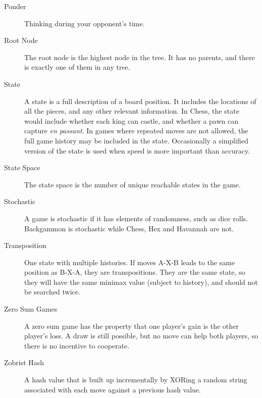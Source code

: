 \begin{description}
\item[Ponder] Thinking during your opponent's time.
\item[Root Node] The root node is the highest node in the tree. It has no parents, and there is exactly one of them in any tree.
\item[State] A state is a full description of a board position. It includes the locations of all the pieces, and any other relevant information. In Chess, the state would include whether each king can castle, and whether a pawn can capture \textit{en passant}. In games where repeated moves are not allowed, the full game history may be included in the state. Occasionally a simplified version of the state is used when speed is more important than accuracy.
\item[State Space] The state space is the number of unique reachable states in the game.
\item[Stochastic] A game is stochastic if it has elements of randomness, such as dice rolls. Backgammon is stochastic while Chess, Hex and Havannah are not.
\item[Transposition] One state with multiple histories. If moves A-X-B leads to the same position as B-X-A, they are transpositions. They are the same state, so they will have the same minimax value (subject to history), and should not be searched twice.
\item[Zero Sum Games] A zero sum game has the property that one player's gain is the other player's loss. A draw is still possible, but no move can help both players, so there is no incentive to cooperate.
\item[Zobrist Hash] A hash value that is built up incrementally by XORing a random string associated with each move against a previous hash value.

\end{description}

